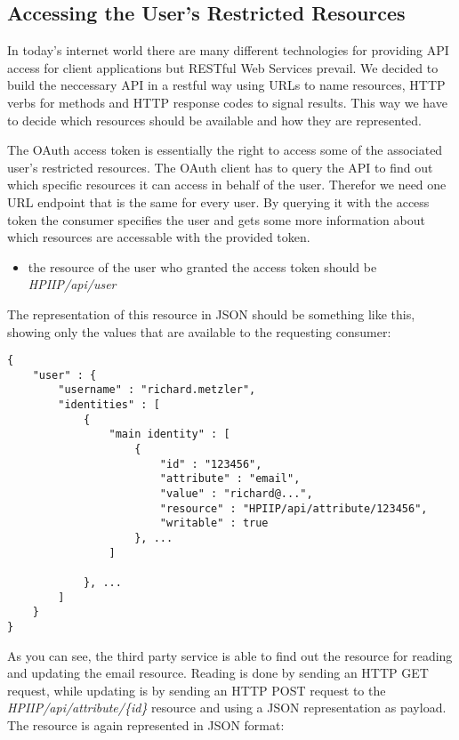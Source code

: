 \subsection{Accessing the User's Restricted Resources}

In today's internet world there are many different technologies for
providing API access for client applications but RESTful Web Services prevail.
We decided to build the neccessary API in a restful way using URLs to name
resources, HTTP verbs for methods and HTTP response codes to signal
results. \cite{rest} This way we have to decide which resources should
be available and how they are represented.

The OAuth access token is essentially the right to access some of
the associated user's restricted resources. The OAuth client has to
query the API to find out which specific resources it can access in
behalf of the user. Therefor we need one URL endpoint that is the
same for every user. By querying it with the access token the
consumer specifies the user and gets some more information about
which resources are accessable with the provided token.

\begin{itemize}
\item
  the resource of the user who granted the access token should be
  \emph{HPIIP/api/user}
\end{itemize}
The representation of this resource in JSON should be something
like this, showing only the values that are available to the
requesting consumer:

\begin{verbatim}
{
    "user" : {
        "username" : "richard.metzler",
        "identities" : [
            {
                "main identity" : [
                    {
                        "id" : "123456",
                        "attribute" : "email",
                        "value" : "richard@...",
                        "resource" : "HPIIP/api/attribute/123456",
                        "writable" : true
                    }, ...
                ]

            }, ...
        ]
    }
}
\end{verbatim}
As you can see, the third party service is able to find out the
resource for reading and updating the email resource. Reading is
done by sending an HTTP GET request, while updating is by sending an HTTP
POST request to the \emph{HPIIP/api/attribute/\{id\}} resource and using a JSON representation as payload.
The resource is again represented in JSON format:


